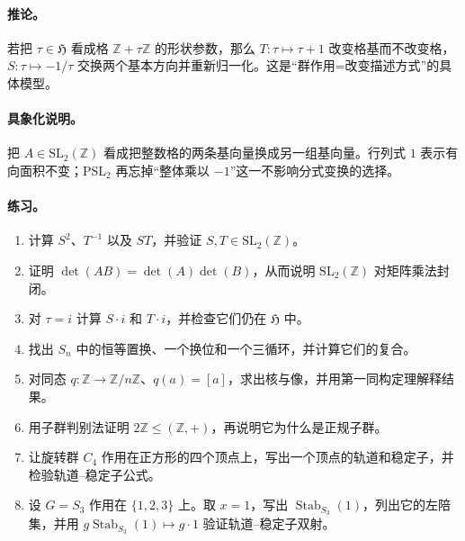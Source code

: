 \documentclass[UTF8,fontset=none,a4paper,11pt]{ctexart}
\theoremstyle{foundation-definition}
\theoremstyle{foundation-theorem}
\theoremstyle{foundation-proposition}
\theoremstyle{foundation-example}
\theoremstyle{foundation-remark}
\theoremstyle{foundation-theorem}
\begin{document}
\paragraph{推论。}
若把 \(\tau\in\mathfrak H\) 看成格 \(\mathbb Z+\tau\mathbb Z\) 的形状参数，那么 \(T:\tau\mapsto\tau+1\) 改变格基而不改变格，\(S:\tau\mapsto-1/\tau\) 交换两个基本方向并重新归一化。这是“群作用=改变描述方式”的具体模型。

\paragraph{具象化说明。}
把 \(A\in\mathrm{SL}_2(\mathbb Z)\) 看成把整数格的两条基向量换成另一组基向量。行列式 \(1\) 表示有向面积不变；\(\mathrm{PSL}_2\) 再忘掉“整体乘以 \(-1\)”这一不影响分式变换的选择。

\paragraph{练习。}
\begin{enumerate}[label=M2.\arabic*.]
  \item 计算 \(S^2\)、\(T^{-1}\) 以及 \(ST\)，并验证 \(S,T\in\mathrm{SL}_2(\mathbb Z)\)。
  \item 证明 \(\det(AB)=\det(A)\det(B)\)，从而说明 \(\mathrm{SL}_2(\mathbb Z)\) 对矩阵乘法封闭。
  \item 对 \(\tau=i\) 计算 \(S\cdot i\) 和 \(T\cdot i\)，并检查它们仍在 \(\mathfrak H\) 中。
  \item 找出 \(S_n\) 中的恒等置换、一个换位和一个三循环，并计算它们的复合。
  \item 对同态 \(q:\mathbb Z\to\mathbb Z/n\mathbb Z\)、\(q(a)=[a]\)，求出核与像，并用第一同构定理解释结果。
  \item 用子群判别法证明 \(2\mathbb Z\leq(\mathbb Z,+)\)，再说明它为什么是正规子群。
  \item 让旋转群 \(C_4\) 作用在正方形的四个顶点上，写出一个顶点的轨道和稳定子，并检验轨道--稳定子公式。
  \item 设 \(G=S_3\) 作用在 \(\{1,2,3\}\) 上。取 \(x=1\)，写出
    \(\operatorname{Stab}_{S_3}(1)\)，列出它的左陪集，并用
    \(g\operatorname{Stab}_{S_3}(1)\mapsto g\cdot1\) 验证轨道--稳定子双射。
\end{enumerate}
\end{document}
